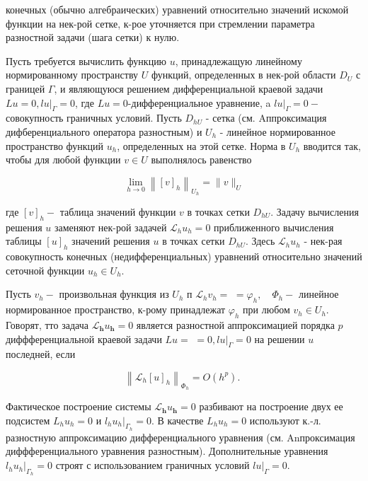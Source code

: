 \documentclass[10pt]{article}
\begin{document}
конечных (обычно алгебраических) уравнений относительно значений искомой функции на нек-рой сетке, к-рое уточняется при стремлении параметра разностной задачи (шага сетки) к нулю.



Пусть требуется вычислить функцию $u$, принадлежащую линейному нормированному пространству $U$ функций, определенных в нек-рой области $D_{U}$ с границей $\Gamma$, и являющуюся решением дифференциальной краевой задачи $L u=0,\left.l u\right|_{\Gamma}=0$, где $L u=0$-дифференциальное уравнение, a $\left.l u\right|_{\Gamma}=0-$ совокупность граничных условий. Пусть $D_{h U}$ - сетка (см. Aппроксимация дифберенциального оператора разностным) и $U_{h}$ - линейное нормированное пространство функций $u_{h}$, определенных на этой сетке. Норма в $U_{h}$ вводится так, чтобы для любой функции $v \in U$ выполнялось равенство



\[

\lim _{h \rightarrow 0}\left\|[v]_{h}\right\|_{U_{h}}=\|v\|_{U}

\]



где $[v]_{h}-$ таблица значений функции $v$ в точках сетки $D_{h U}$. Задачу вычисления решения $u$ заменяют нек-рой задачей $\mathscr{L}_{h} u_{h}=0$ приближенного вычисления таблицы $[u]_{h}$ значений решения $u$ в точках сетки $D_{h U}$. Здесь $\mathscr{L}_{h} u_{h}$ - нек-рая совокупность конечных (недифференциальных) уравнений относительно значений сеточной функции $u_{h} \in U_{h}$.



Пусть $v_{h}-$ произвольная функция из $U_{h}$ п $\mathscr{L}_{h} v_{h}=$ $=\varphi_{h}, \quad \Phi_{h}-$ линейное нормированное пространство, к-рому принадлежат $\varphi_{h}$ при любом $v_{h} \in U_{h}$. Говорят, тто задача $\mathscr{L}_{\boldsymbol{h}} u_{\boldsymbol{h}}=0$ является разностной аппроксимацией порядка $p$ диффференциальной краевой задачи $L u=$ $=0,\left.l u\right|_{\Gamma}=0$ на решении $u$ последней, если



\[

\left\|\mathscr{L}_{h}[u]_{h}\right\|_{\Phi_{h}}=O\left(h^{p}\right) \text {. }

\]



Фактическое построение системы $\mathscr{L}_{\boldsymbol{h}} u_{\boldsymbol{h}}=0$ разбивают на построение двух ее подсистем $L_{h} u_{h}=0$ и $\left.l_{h} u_{h}\right|_{\Gamma_{h}}=0$. В качестве $L_{h} u_{h}=0$ используют к.-л. разностную аппроксимацию дифференциального уравнения (см. Anпроксимация диффференциального уравнения разностным). Дополнительные уравнения $\left.l_{h} u_{h}\right|_{\Gamma_{h}}=0$ строят с использованием граничных условий $\left.l u\right|_{\Gamma}=0$.
\end{document}
